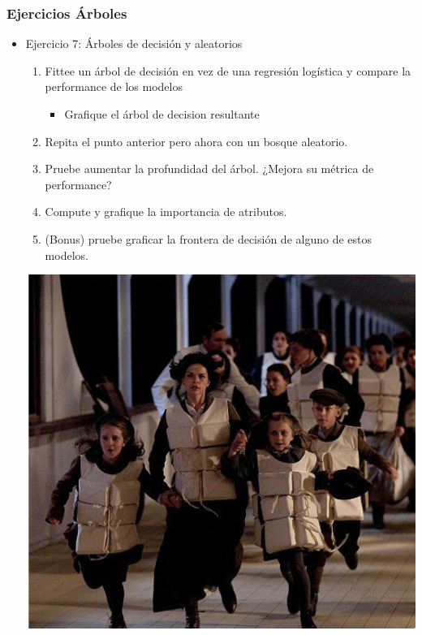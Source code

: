 \documentclass[leqno, 10pt, envcountsect]{beamer}
\numberwithin{equation}{section}
\theoremstyle{definition}
\theoremstyle{example}
\numberwithin{figure}{section}
\numberwithin{table}{section}
\let\olditem\item
\renewcommand{\item}{%
\olditem\vspace{1pt}}
\begin{document}
\begin{frame}
  \frametitle{Ejercicios Árboles}
  \begin{itemize}
    \item Ejercicio 7: Árboles de decisión y aleatorios
      \begin{enumerate}
        \item Fittee un árbol de decisión en vez de una regresión logística y
          compare la performance de los modelos
          \begin{itemize}
            \item Grafique el árbol de decision resultante
          \end{itemize}
        \item Repita el punto anterior pero ahora con un bosque aleatorio.
        \item Pruebe aumentar la profundidad del árbol. ¿Mejora su métrica de
          performance?
        \item Compute y grafique la importancia de atributos.
        \item (Bonus) pruebe graficar la frontera de decisión de alguno de
          estos modelos.
      \end{enumerate}
      \begin{center}
        \includegraphics[scale=0.18]{run.png}
      \end{center}
  \end{itemize}

\end{frame}
\end{document}
